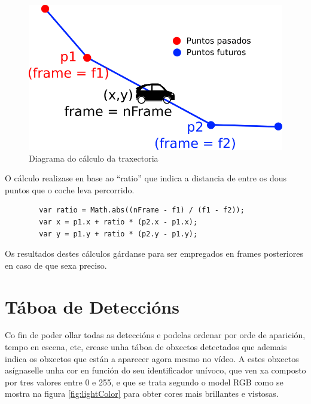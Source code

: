     \begin{figure}[htp]
    \begin{center}
        \includegraphics[scale=0.4]{figures/calcTrajectory.png}
        \caption{Diagrama do cálculo da traxectoria}
    \label{fig:calcTrajectory}
    \end{center}
    \end{figure}
    
    O cálculo realizase en base ao ``ratio'' que indica a distancia de entre os dous puntos que o coche 
    leva percorrido.
    
    \begin{verbatim}
        var ratio = Math.abs((nFrame - f1) / (f1 - f2));
        var x = p1.x + ratio * (p2.x - p1.x);
        var y = p1.y + ratio * (p2.y - p1.y);    
    \end{verbatim}
    
    Os resultados destes cálculos gárdanse para ser empregados en frames posteriores en caso de que
    sexa preciso.

\section{Táboa de Deteccións}

    Co fin de poder ollar todas as deteccións e podelas ordenar por orde de aparición, tempo en 
    escena, etc, crease unha táboa de obxectos detectados que ademais indica os obxectos que están
    a aparecer agora mesmo no vídeo. A estes obxectos asígnaselle unha cor en función do seu 
    identificador unívoco, que ven xa composto por tres valores entre 0 e 255, e que se trata 
    segundo o model RGB como se mostra na figura \ref{fig:lightColor} para obter cores mais 
    brillantes e vistosas.
    
